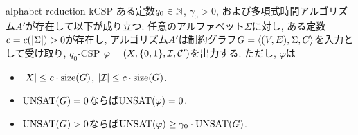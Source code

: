 \begin{lemma}{}{alphabet-reduction-kCSP}
  ある定数$q_0\in\mathbb{N}$, $\gamma_0>0$, および多項式時間アルゴリズム$A'$が存在して以下が成り立つ:
  任意のアルファベット$\Sigma$に対し, ある定数$c=c(\abs{\Sigma})>0$が存在し,
  アルゴリズム$A'$は制約グラフ$G=\langle(V,E),\Sigma,C\rangle$を入力として受け取り,
  $q_0$-CSP $\varphi=(X,\{0,1\},\mathcal{I},\mathcal{C}')$を出力する.
  ただし, $\varphi$は
  \begin{itemize}
    \item $\abs{X} \le c\cdot\mathrm{size}(G)$, $\abs{\mathcal{I}} \le c\cdot\mathrm{size}(G)$.
    \item $\mathrm{UNSAT}(G)=0$ならば$\mathrm{UNSAT}(\varphi)=0$.
    \item $\mathrm{UNSAT}(G)>0$ならば$\mathrm{UNSAT}(\varphi) \ge \gamma_0\cdot\mathrm{UNSAT}(G)$.
  \end{itemize}
\end{lemma}
